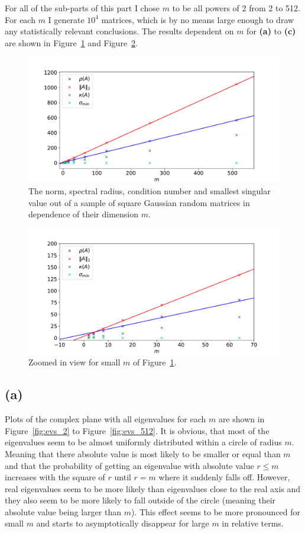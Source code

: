 \documentclass[a4paper, 11pt]{article}
\begin{document}
For all of the sub-parts of this part I chose $m$ to be all powers of 2 from 2
to 512. For each $m$ I generate $10^{4}$ matrices, which is by no means large
enough to draw any statistically relevant conclusions. The results dependent on
$m$ for \textbf{(a)} to \textbf{(c)} are shown in Figure~\ref{fig:a-c} and
Figure~\ref{fig:a-c_zoomed}.
\begin{figure}
  \centering
  \includegraphics[width=\textwidth]{../2/norm_spectral_cond.pdf}
  \caption{The norm, spectral radius, condition number and smallest singular
  value out of a sample of square Gaussian random matrices in dependence of
  their dimension $m$.}
  \label{fig:a-c}
\end{figure}
\begin{figure}
  \centering
  \includegraphics[width=\textwidth]{../2/norm_spectral_cond_zoomed.pdf}
  \caption{Zoomed in view for small $m$ of Figure~\ref{fig:a-c}.}
  \label{fig:a-c_zoomed}
\end{figure}

\FloatBarrier
\subsection*{(a)}
Plots of the complex plane with all eigenvalues for each $m$ are shown in
Figure~\ref{fig:evs_2} to Figure~\ref{fig:evs_512}. It is obvious, that most of
the eigenvalues seem to be almost uniformly distributed within a circle of
radius $m$. Meaning that there absolute value is most likely to be smaller or
equal than $m$ and that the probability of getting an eigenvalue with absolute
value $r \leq m$ increases with the square of $r$ until $r = m$ where it
suddenly falls off. However, real eigenvalues seem to be more likely than
eigenvalues close to the real axis and they also seem to be more likely to fall
outside of the circle (meaning their absolute value being larger than $m$).
This effect seems to be more pronounced for small $m$ and starts to
asymptotically disappear for large $m$ in relative terms. 
\end{document}
